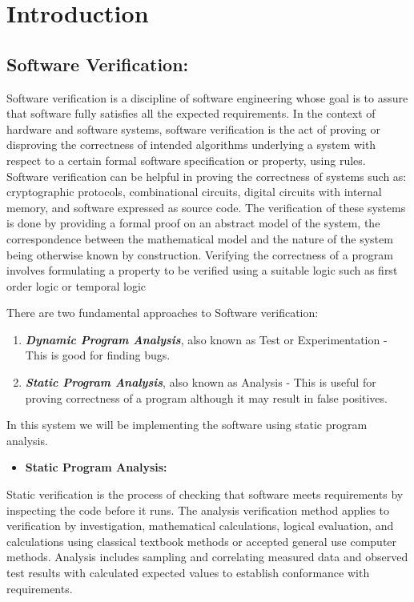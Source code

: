 \section{Introduction}\label{introduction}

\subsection{Software Verification:}\label{software-verification}

Software verification is a discipline of software engineering whose goal
is to assure that software fully satisfies all the expected
requirements. In the context of hardware and software systems, software
verification is the act of proving or disproving the correctness of
intended algorithms underlying a system with respect to a certain formal
software specification or property, using rules. Software verification
can be helpful in proving the correctness of systems such as:
cryptographic protocols, combinational circuits, digital circuits with
internal memory, and software expressed as source code. The verification
of these systems is done by providing a formal proof on an abstract
model of the system, the correspondence between the mathematical model
and the nature of the system being otherwise known by construction.
Verifying the correctness of a program involves formulating a property
to be verified using a suitable logic such as first order logic or
temporal logic

There are two fundamental approaches to Software verification:

\begin{enumerate}
\def\labelenumi{\arabic{enumi}.}
\item
  \emph{\textbf{Dynamic Program Analysis}}, also known as Test or
  Experimentation - This is good for finding bugs.
\item
  \emph{\textbf{Static Program Analysis}}, also known as Analysis - This
  is useful for proving correctness of a program although it may result
  in false positives.
\end{enumerate}

In this system we will be implementing the software using static program
analysis.

\begin{itemize}
\tightlist
\item
  \textbf{Static Program Analysis:}
\end{itemize}

Static verification is the process of checking that software meets
requirements by inspecting the code before it runs. The analysis
verification method applies to verification by investigation,
mathematical calculations, logical evaluation, and calculations using
classical textbook methods or accepted general use computer methods.
Analysis includes sampling and correlating measured data and observed
test results with calculated expected values to establish conformance
with requirements.

